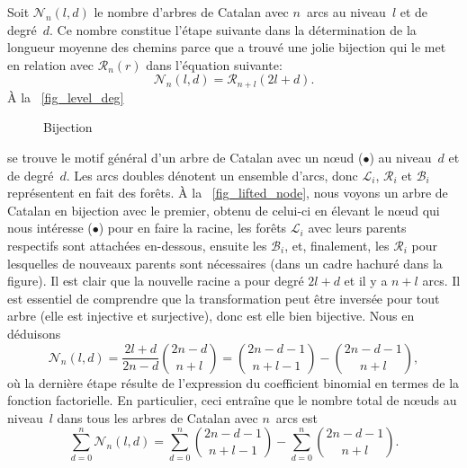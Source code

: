 Soit \(\mathcal{N}_n(l,d)\) le nombre d'arbres de Catalan avec
\(n\)~arcs au niveau~\(l\) et de degré~\(d\). Ce nombre constitue
l'étape suivante dans la détermination de la longueur moyenne des
chemins parce que \cite{Ruskey_1983} a trouvé une jolie bijection qui
le met en relation avec \(\mathcal{R}_n(r)\) dans l'équation suivante:
\begin{equation*}
\mathcal{N}_n(l,d) = \mathcal{R}_{n+l}(2l+d).
\end{equation*}
À la \fig~\ref{fig_level_deg}
\begin{figure}
\centering
{}
\quad
{}
\caption{Bijection\label{fig_bij_root_level}}
\end{figure}
se trouve le motif général d'un arbre de Catalan avec un n{\oe}ud
(\(\bullet\)) au niveau~\(d\) et de degré~\(d\). Les arcs doubles
dénotent un ensemble d'arcs, donc \(\mathcal{L}_i\), \(\mathcal{R}_i\)
et \(\mathcal{B}_i\) représentent en fait des forêts. À la
\fig~\ref{fig_lifted_node}, nous voyons un arbre de Catalan en
bijection avec le premier, obtenu de celui-ci en élevant le n{\oe}ud
qui nous intéresse (\(\bullet\)) pour en faire la racine, les forêts
\(\mathcal{L}_i\) avec leurs parents respectifs sont attachées
en-dessous, ensuite les \(\mathcal{B}_i\), et, finalement, les
\(\mathcal{R}_i\) pour lesquelles de nouveaux parents sont nécessaires
(dans un cadre hachuré dans la figure). Il est clair que la nouvelle
racine a pour degré \(2l+d\) et il y a \(n+l\) arcs. Il est essentiel
de comprendre que la transformation peut être inversée pour tout arbre
(elle est injective et surjective), donc est elle bien bijective. Nous
en déduisons
\begin{equation*}
\mathcal{N}_n(l,d) = \frac{2l+d}{2n-d}\binom{2n-d}{n+l}
= \binom{2n-d-1}{n+l-1} - \binom{2n-d-1}{n+l},
\end{equation*}
où la dernière étape résulte de l'expression du coefficient binomial en termes de la fonction factorielle. En particulier, ceci entraîne que le nombre total de n{\oe}uds au niveau~\(l\) dans tous les arbres de Catalan avec \(n\)~arcs est
\begin{equation*}
\sum_{d=0}^{n}\mathcal{N}_n(l,d)
  = \sum_{d=0}^{n}\binom{2n-d-1}{n+l-1}
    - \sum_{d=0}^{n}\binom{2n-d-1}{n+l}.
\end{equation*}
